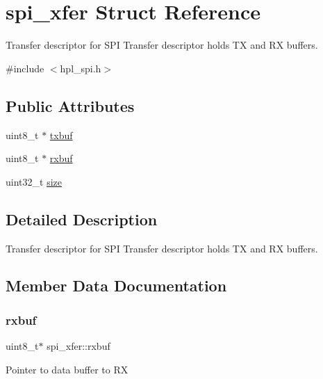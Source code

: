 \hypertarget{structspi__xfer}{}\section{spi\+\_\+xfer Struct Reference}
\label{structspi__xfer}


Transfer descriptor for S\+PI Transfer descriptor holds TX and RX buffers.  




{\ttfamily \#include $<$hpl\+\_\+spi.\+h$>$}

\subsection*{Public Attributes}
\begin{DoxyCompactItemize}
\item 
uint8\+\_\+t $\ast$ \hyperlink{structspi__xfer_a926e5eb02b0e309311d98b6c43e3e7ac}{txbuf}
\item 
uint8\+\_\+t $\ast$ \hyperlink{structspi__xfer_a79f5a9b3462211bf5c0ba8318ab60f24}{rxbuf}
\item 
uint32\+\_\+t \hyperlink{structspi__xfer_a09c60b4a03faf3b06e5ad5acc3d5c3ea}{size}
\end{DoxyCompactItemize}


\subsection{Detailed Description}
Transfer descriptor for S\+PI Transfer descriptor holds TX and RX buffers. 

\subsection{Member Data Documentation}
\mbox{\label{structspi__xfer_a79f5a9b3462211bf5c0ba8318ab60f24}} 
\subsubsection{\texorpdfstring{rxbuf}{rxbuf}}
{\footnotesize\ttfamily uint8\+\_\+t$\ast$ spi\+\_\+xfer\+::rxbuf}

Pointer to data buffer to RX \mbox{\label{structspi__xfer_a09c60b4a03faf3b06e5ad5acc3d5c3ea}} 
